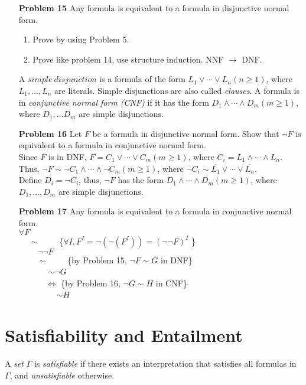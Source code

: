 \documentclass[12pt]{article}
\begin{document}
\begin{enumerate}
\item[\textbf{Problem 15}] Any formula is equivalent to a formula in disjunctive normal form.  
\begin{enumerate}[Prove 1:]
    \item Prove by using Problem 5.
    \item Prove like problem 14, use structure induction. NNF $\rightarrow$ DNF. 
\end{enumerate}

A $simple~ disjunction$ is a formula of the form $L_1 \vee \cdots \vee L_n (n \geq 1)$, where $L_1, \ldots, L_n$ are literals. Simple disjunctions are also called \textit{clauses}. 
A formula is in \textit{conjunctive normal form (CNF)} if it has the form $D_1 \wedge \cdots \wedge D_m (m \geq 1)$, where $D_1, \ldots D_m$ are simple disjunctions. 


\item[\textbf{Problem 16}] Let $F$ be a formula in disjunctive normal form. Show that $\neg F$ is equivalent to a formula in conjunctive normal form. \\
Since $F$ is in DNF, $F = C_1 \vee \cdots \vee C_m (m \geq 1)$, where $C_i = L_1 \wedge \cdots \wedge L_n$. \\
Thus, $\neg F \sim \neg C_1 \wedge \cdots \wedge \neg C_m (m \geq 1)$, where $\neg C_i \sim \overline{L_1} \vee \cdots \vee \overline{L_n}$. \\
Define $D_i = \neg C_i$, thus, $\neg F$ has the form $D_1 \wedge \cdots \wedge D_m (m \geq 1)$, where $D_1, \ldots, D_m$ are simple disjunctions. 

\item[\textbf{Problem 17}] Any formula is equivalent to a formula in conjunctive normal form.   \\
$\forall F $ \\
$~\quad \sim \qquad$  \{$\forall I, F^I = \neg (\neg (F^I)) = (\neg \neg F)^I$ \}\\
    $~\qquad \neg \neg F$  \\
$~\qquad \sim \qquad$   \{by Problem 15, $\neg F \sim G $ in DNF\}  \\ 
    $~\qquad \quad $ $\sim \neg G$  \\
 $~\qquad \quad \iff$   \{by Problem 16, $\neg G \sim H$ in CNF\}  \\ 
    $~\qquad \qquad $ $\sim H$ 
\end{enumerate}

\section*{Satisfiability and Entailment \colorbox{green}{}}
A \textit{set} $\Gamma$ is \textit{satisfiable} if there exists an interpretation that satisfies all formulas in $\Gamma$, and \textit{unsatisfiable} otherwise. 
\end{document}
